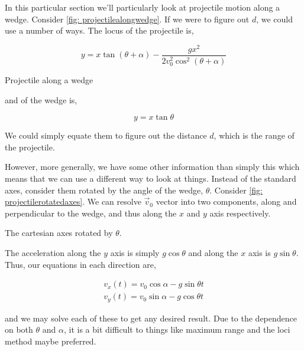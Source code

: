 In this particular section we'll particularly look at projectile motion along a wedge. Consider 
\cref{fig: projectilealongwedge}. If we were to figure out \(d\), we could 
use a number of ways. The locus of the projectile is,

\begin{equation*}
    y = x\tan(\theta+\alpha) - \frac{gx^2}{2v_0^2\cos^2(\theta+\alpha)}
\end{equation*}

\begin{marginfigure}
    \centering
    \caption{Projectile along a wedge}
    \label{fig: projectilealongwedge}
\end{marginfigure}

and of the wedge is,

\begin{equation*}
    y = x\tan\theta 
\end{equation*}

We could simply equate them to figure out the distance \(d\), which is the range of the projectile.

However, more generally, we have some other information than simply this which means that we 
can use a different way to look at things. Instead of the standard axes, consider them rotated 
by the angle of the wedge, \(\theta\). Consider \cref{fig: projectilerotatedaxes}.
We can resolve \(\vec{v}_0\) vector into two components, along and perpendicular to the wedge,
and thus along the \(x\) and \(y\) axis respectively. 

\begin{marginfigure}
    \centering
    \caption{The cartesian axes rotated by \(\theta\).}
    \label{fig: projectilerotatedaxes}
\end{marginfigure}

The acceleration along the \(y\) axis is simply \(g\cos\theta\) and along the \(x\) axis 
is \(g\sin\theta\). Thus, our equations in each direction are,

\begin{align*}
    v_x(t) = v_0\cos\alpha - g\sin\theta t\\
    v_y(t) = v_0\sin\alpha - g\cos\theta t 
\end{align*}

and we may solve each of these to get any desired result. Due to the dependence 
on both \(\theta\) and \(\alpha\), it is a bit difficult to things like maximum range
and the loci method maybe preferred.  

